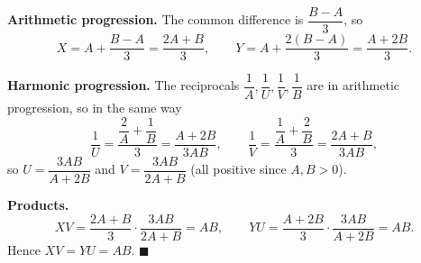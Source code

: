 \textbf{Arithmetic progression.} The common difference is $\dfrac{B-A}{3}$, so
\[
X=A+\dfrac{B-A}{3}=\dfrac{2A+B}{3},\qquad Y=A+\dfrac{2(B-A)}{3}=\dfrac{A+2B}{3}.
\]

\textbf{Harmonic progression.} The reciprocals $\dfrac{1}{A},\dfrac{1}{U},\dfrac{1}{V},\dfrac{1}{B}$ are in arithmetic progression, so in the same way
\[
\dfrac{1}{U}=\dfrac{\dfrac{2}{A}+\dfrac{1}{B}}{3}=\dfrac{A+2B}{3AB},\qquad \dfrac{1}{V}=\dfrac{\dfrac{1}{A}+\dfrac{2}{B}}{3}=\dfrac{2A+B}{3AB},
\]
so $U=\dfrac{3AB}{A+2B}$ and $V=\dfrac{3AB}{2A+B}$ (all positive since $A,B>0$).

\textbf{Products.}
\[
XV=\dfrac{2A+B}{3}\cdot\dfrac{3AB}{2A+B}=AB,\qquad YU=\dfrac{A+2B}{3}\cdot\dfrac{3AB}{A+2B}=AB .
\]
Hence $XV=YU=AB$. $\blacksquare$
